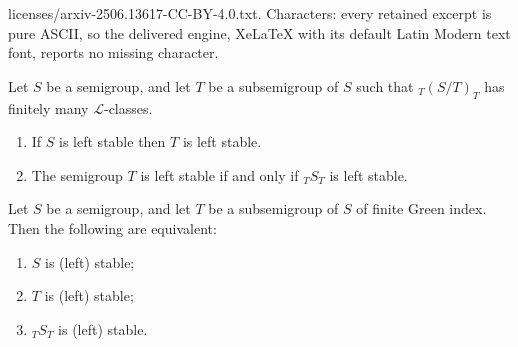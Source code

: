 \documentclass[10pt,a4paper]{amsart}
\renewcommand{\l}{\mbox{${\mathcal{L}}$}}
\begin{document}
licenses/arxiv-2506.13617-CC-BY-4.0.txt. Characters: every retained excerpt is pure ASCII, so the delivered engine, XeLaTeX with its default Latin Modern text font, reports no missing character.
\begin{prop}\label{prop:subsemigroup,L-classes}
Let $S$ be a semigroup, and let $T$ be a subsemigroup of $S$ such that ${_T}(S/T)_T$ has finitely many $\l$-classes.
\begin{enumerate}[leftmargin=*]
\item[\emph{(1)}] If $S$ is left stable then $T$ is left stable.
\item[\emph{(2)}] The semigroup $T$ is left stable if and only if ${_T}S_T$ is left stable.
\end{enumerate}
\end{prop}

\begin{thm}\label{thm:Greenindex,stab}
Let $S$ be a semigroup, and let $T$ be a subsemigroup of $S$ of finite Green index.  Then the following are equivalent:
\begin{enumerate}[leftmargin=*]
\item[\emph{(1)}] $S$ is (left) stable;
\item[\emph{(2)}] $T$ is (left) stable;
\item[\emph{(3)}] ${_T}S_T$ is (left) stable.
\end{enumerate}
\end{thm}
\end{document}
